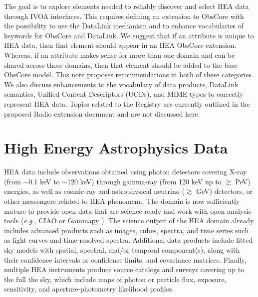 \documentclass[11pt,a4paper]{ivoa}
\begin{document}
The goal is to explore elements needed to reliably discover and select \gls{HEA} data through \gls{IVOA} interfaces. This requires defining an extension to ObsCore with the possibility to use the DataLink mechanism and to enhance vocabularies of keywords for ObsCore and DataLink. We suggest that if an attribute is unique to \gls{HEA} data, then that element should appear in an \gls{HEA} ObsCore extension. Whereas, if an attribute makes sense for more than one domain and can be shared across those domains, then that element should be added to the base ObsCore model. This note proposes recommendations in both of these categories. We also discuss enhancements to the vocabulary of data\/ products, DataLink semantics, Unified Content Descriptors (UCDs), and MIME-types to correctly represent \gls{HEA} data. Topics related to the Registry are currently outlined in the proposed Radio extension document and are not discussed here.


\section{High Energy Astrophysics Data}

\gls{HEA} data include observations obtained using photon detectors covering X-ray (from $\sim$0.1 keV to $\sim$120 keV) through gamma-ray (from 120 keV up to $\gtrsim$ PeV) energies, as well as cosmic-ray and astrophysical neutrino ($\gtrsim$ GeV) detectors, or other messengers related to \gls{HEA} phenomena. The domain is now sufficiently mature to provide open data that are science-ready and work with open analysis tools ({\em e.g.\/}, CIAO \citep{2006SPIE.6270E..1VF} or Gammapy \citep{gammapy:2023}). The science output of the \gls{HEA} domain already includes advanced products such as images, cubes, spectra, and time series such as light curves and time-resolved spectra. Additional data products include fitted sky models with spatial, spectral, and/or temporal component(s), along with their confidence intervals or confidence limits, and covariance matrices.   Finally, multiple \gls{HEA} instruments produce source catalogs and surveys covering up to the full the sky, which include maps of photon or particle flux, exposure, sensitivity, and aperture-photometry likelihood profiles.
\end{document}
